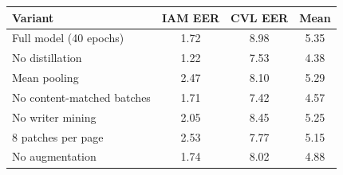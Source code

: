 \begin{tabular}{lccc}
\toprule
Variant & IAM EER & CVL EER & Mean \\
\midrule
Full model (40 epochs) & 1.72 & 8.98 & 5.35 \\
No distillation & 1.22 & 7.53 & 4.38 \\
Mean pooling & 2.47 & 8.10 & 5.29 \\
No content-matched batches & 1.71 & 7.42 & 4.57 \\
No writer mining & 2.05 & 8.45 & 5.25 \\
8 patches per page & 2.53 & 7.77 & 5.15 \\
No augmentation & 1.74 & 8.02 & 4.88 \\
\bottomrule
\end{tabular}
